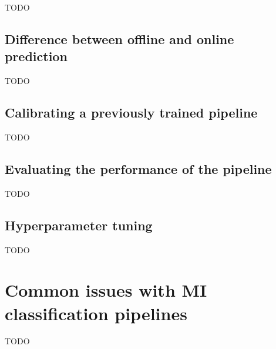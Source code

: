 TODO


\subsection{Difference between offline and online prediction}
\label{subsec:processing_signals_evaluating_and_using_offline_vs_online}

TODO


\subsection{Calibrating a previously trained pipeline}
\label{subsec:processing_signals_evaluating_and_using_calibration}

TODO


\subsection{Evaluating the performance of the pipeline}
\label{subsec:processing_signals_evaluating_and_using_evaluation}


TODO



\subsection{Hyperparameter tuning}
\label{subsec:processing_signals_evaluating_and_using_hyperparameter_tuning}

TODO


\section{Common issues with MI classification pipelines}
\label{sec:processing_signals_common_issues}

TODO


